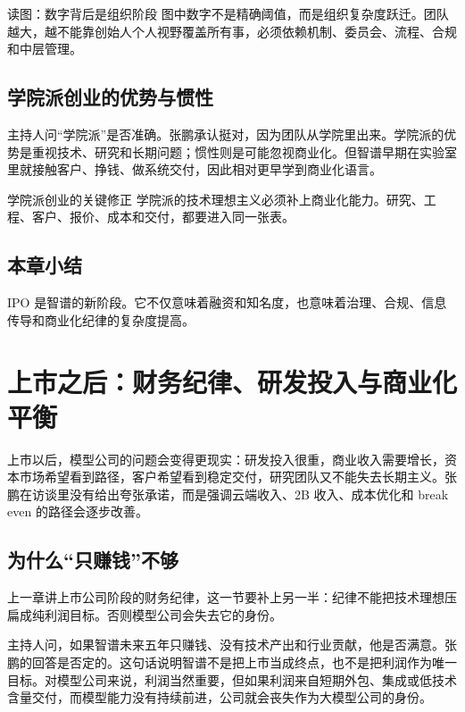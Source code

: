 \documentclass[a4paper]{article}
\begin{document}
\begin{knowledgebox}{读图：数字背后是组织阶段}
图中数字不是精确阈值，而是组织复杂度跃迁。团队越大，越不能靠创始人个人视野覆盖所有事，必须依赖机制、委员会、流程、合规和中层管理。
\end{knowledgebox}

\subsection{学院派创业的优势与惯性}

主持人问“学院派”是否准确。张鹏承认挺对，因为团队从学院里出来。学院派的优势是重视技术、研究和长期问题；惯性则是可能忽视商业化。但智谱早期在实验室里就接触客户、挣钱、做系统交付，因此相对更早学到商业化语言。

\begin{importantbox}{学院派创业的关键修正}
学院派的技术理想主义必须补上商业化能力。研究、工程、客户、报价、成本和交付，都要进入同一张表。
\end{importantbox}

\subsection{本章小结}

IPO 是智谱的新阶段。它不仅意味着融资和知名度，也意味着治理、合规、信息传导和商业化纪律的复杂度提高。

\section{上市之后：财务纪律、研发投入与商业化平衡}

上市以后，模型公司的问题会变得更现实：研发投入很重，商业收入需要增长，资本市场希望看到路径，客户希望看到稳定交付，研究团队又不能失去长期主义。张鹏在访谈里没有给出夸张承诺，而是强调云端收入、2B 收入、成本优化和 break even 的路径会逐步改善。

\subsection{为什么“只赚钱”不够}

上一章讲上市公司阶段的财务纪律，这一节要补上另一半：纪律不能把技术理想压扁成纯利润目标。否则模型公司会失去它的身份。

主持人问，如果智谱未来五年只赚钱、没有技术产出和行业贡献，他是否满意。张鹏的回答是否定的。这句话说明智谱不是把上市当成终点，也不是把利润作为唯一目标。对模型公司来说，利润当然重要，但如果利润来自短期外包、集成或低技术含量交付，而模型能力没有持续前进，公司就会丧失作为大模型公司的身份。
\end{document}
